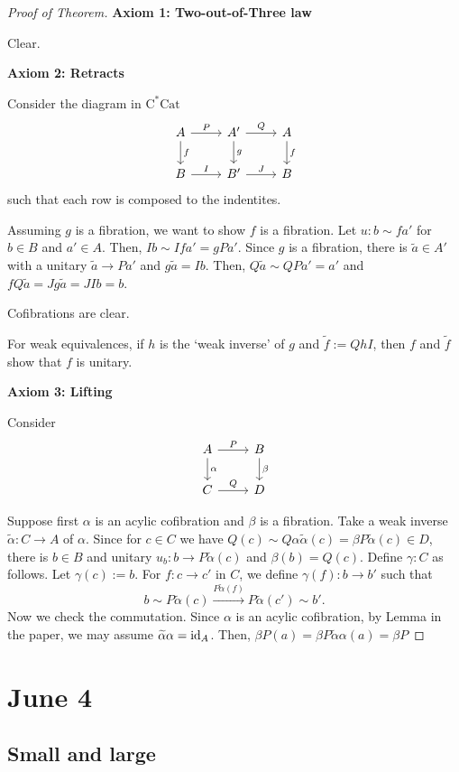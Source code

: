 \documentclass{../../../small}
\begin{document}
\begin{proof}[Proof of Theorem]
\textbf{Axiom 1: Two-out-of-Three law}

Clear.

\textbf{Axiom 2: Retracts}

Consider the diagram in $\mathrm{C^*Cat}$
\[\begin{tikzcd}
A\rar{P}\dar{f}&A'\rar{Q}\dar{g}&A\dar{f}\\
B\rar{I}&B'\rar{J}&B
\end{tikzcd}\]
such that each row is composed to the indentites.

Assuming $g$ is a fibration, we want to show $f$ is a fibration.
Let $u:b\sim fa'$ for $b\in B$ and $a'\in A$.
Then, $Ib\sim Ifa'=gPa'$.
Since $g$ is a fibration, there is $\tilde a\in A'$ with a unitary $\tilde a\to Pa'$ and $g\tilde a=Ib$.
Then, $Q\tilde a\sim QPa'=a'$ and $fQ\tilde a=Jg\tilde a=JIb=b$.

Cofibrations are clear.

For weak equivalences, if $h$ is the `weak inverse' of $g$ and $\tilde f:=QhI$, then $f$ and $\tilde f$ show that $f$ is unitary.


\textbf{Axiom 3: Lifting}

Consider
\[\begin{tikzcd}
A\rar{P}\dar{\alpha}&B\dar{\beta}\\
C\rar{Q}&D
\end{tikzcd}\]

Suppose first $\alpha$ is an acylic cofibration and $\beta$ is a fibration.
Take a weak inverse $\tilde\alpha:C\to A$ of $\alpha$.
Since for $c\in C$ we have $Q(c)\sim Q\alpha\tilde\alpha(c)=\beta P\tilde\alpha(c)\in D$, there is $b\in B$ and unitary $u_b:b\to P\tilde\alpha(c)$ and $\beta(b)=Q(c)$.
Define $\gamma:C$ as follows.
Let $\gamma(c):=b$.
For $f:c\to c'$ in $C$, we define $\gamma(f):b\to b'$ such that
\[b\sim P\tilde\alpha(c)\xrightarrow{P\tilde\alpha(f)}P\tilde\alpha(c')\sim b'.\]
Now we check the commutation.
Since $\alpha$ is an acylic cofibration, by Lemma in the paper, we may assume $\widetilde\alpha\alpha=\operatorname{id}_A$.
Then, $\beta P(a)=\beta P\tilde\alpha\alpha(a)=\beta P$


\end{proof}


\newpage
\section{June 4}


\subsection{Small and large}
\end{document}
